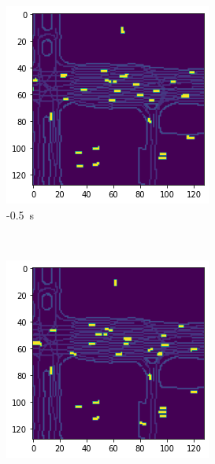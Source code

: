 \documentclass[12pt]{article}
\begin{document}
\begin{figure}[H]
\begin{subfigure}[b]{0.18\textwidth}
            \includegraphics[width=\textwidth]{output_opposite_1.png}
            \caption{-0.5~s}
        \end{subfigure}
        ~
        \begin{subfigure}[b]{0.18\textwidth}
            \includegraphics[width=\textwidth]{output_opposite_2.png}

\end{subfigure}
\end{figure}
\end{document}
